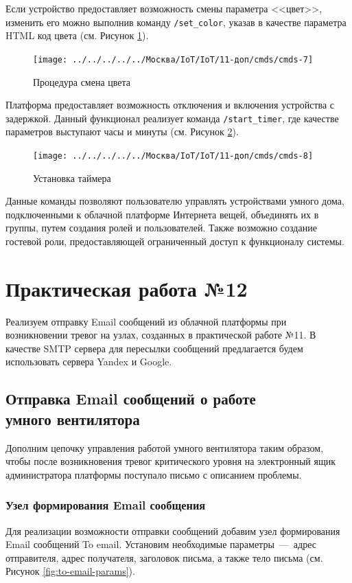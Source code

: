 \documentclass[a4paper,14pt]{extarticle}
\begin{document}
Если устройство предоставляет возможность смены параметра <<цвет>>, изменить его можно выполнив команду \texttt{/set\_color}, указав в качестве параметра HTML код цвета (см. Рисунок \ref{fig:cmds-7}). 

\begin{figure}[h!]
	\centering
	\texttt{[image: ../../../../../Москва/IoT/IoT/11-доп/cmds/cmds-7]}
	\caption{Процедура смена цвета}
	\label{fig:cmds-7}
\end{figure}


Платформа предоставляет возможность отключения и включения устройства с задержкой. Данный функционал реализует команда \texttt{/start\_timer}, где качестве параметров выступают часы и минуты (см. Рисунок \ref{fig:cmds-8}). 
\begin{figure}[h!]
	\centering
	\texttt{[image: ../../../../../Москва/IoT/IoT/11-доп/cmds/cmds-8]}
	\caption{Установка таймера}
	\label{fig:cmds-8}
\end{figure}
\newpage
Данные команды позволяют пользователю управлять устройствами умного дома, подключенными к облачной платформе Интернета вещей, объединять их в группы, путем создания ролей и пользователей. Также возможно создание гостевой роли, предоставляющей ограниченный доступ к функционалу системы.


\section{Практическая работа №12}
Реализуем отправку Email сообщений из облачной платформы при возникновении тревог на узлах, созданных в практической работе №11.
В качестве SMTP сервера для пересылки
сообщений предлагается будем использовать сервера Yandex и Google.

\subsection{Отправка Email сообщений о работе \\умного вентилятора}

Дополним цепочку управления работой умного вентилятора таким образом, чтобы после возникновения тревог критического уровня на электронный ящик администратора платформы поступало письмо с описанием проблемы.
\subsubsection*{Узел формирования Email сообщения}
\label{sec:to-email}
Для реализации возможности отправки сообщений добавим узел формирования Email сообщений To email. Установим необходимые параметры~---~адрес отправителя, адрес получателя, заголовок письма, а также тело письма (см. Рисунок \ref{fig:to-email-params}).
\end{document}

